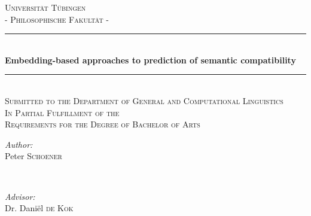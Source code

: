 \documentclass[a4paper, 12pt]{article}
\begin{document}
%
%
%
%
\begin{titlepage}

\newcommand{\HRule}{\rule{\linewidth}{0.5mm}} %

\center %
 

\textsc{\LARGE Universität Tübingen}\\ %
\textsc{\Large - Philosophische Fakultät -}\\[1.5cm]



\HRule \\[0.4cm]
{ \huge \bfseries Embedding-based approaches to prediction of semantic compatibility}\\[0.4cm] %
\HRule \\[1.0cm]
\textsc{\Large Submitted to the Department of General and Computational Linguistics }\\
\textsc{\Large In Partial Fulfillment of the  }\\
\textsc{\Large Requirements for the }
\textsc{\Large Degree of Bachelor of Arts  }\\[0.5cm]

\begin{minipage}{0.4\textwidth}
\begin{flushleft} \large
\emph{Author:}\\
Peter \textsc{Schoener} %
\end{flushleft}
\end{minipage}
~
\begin{minipage}{0.4\textwidth}
\begin{flushright} \large
\emph{Advisor:} \\
Dr. Dani\"el \textsc{de Kok} %
\end{flushright}
\end{minipage}\\[2cm]


\end{titlepage}
\end{document}
